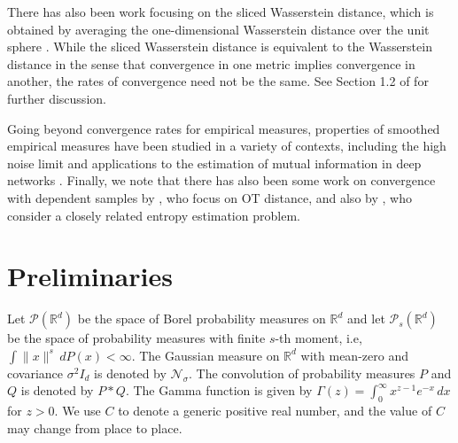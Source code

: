 \documentclass{article}
\theoremstyle{definition}
\newcommand{\reals}{\mathbb{R}}
\newcommand{\cN}{\mathcal{N}}
\newcommand{\cP}{\mathcal{P}}
\begin{document}
There has also been work focusing on the sliced Wasserstein distance,  which is obtained by averaging the one-dimensional Wasserstein distance over the unit sphere \cite{rabin2011wasserstein,bonneel2015sliced}. While the sliced Wasserstein distance is equivalent to the Wasserstein distance in the sense that convergence in one metric implies convergence in another, the rates of convergence need not be the same. See Section 1.2 of \cite{goldfeld2020asymptotic} for further discussion. 


Going beyond convergence rates for empirical measures, properties of smoothed empirical measures have been studied in a variety of contexts, including the high noise limit \cite{chen2020asymptotics} and applications to the estimation of mutual information in deep networks \cite{goldfeld2018estimating}. Finally, we note that there has also been some work on convergence with dependent samples by \cite{fournier:2015}, who focus on OT distance, and also by \cite{young2019consistent}, who  consider a closely related entropy estimation problem. 


\section{Preliminaries}

Let $\cP(\reals^d)$ be the space of Borel probability measures on $\reals^d$ and let $\cP_s(\reals^d)$ be the space of probability measures with finite $s$-th moment, i.e, $\int \|x\|^s \,dP(x) < \infty$. The Gaussian measure on $\reals^d$ with mean-zero and covariance $\sigma^2 I_d$ is denoted by $\cN_\sigma$. The convolution of probability measures $P$ and $Q$ is denoted by $P \ast Q$.  The Gamma function is given by $\Gamma (z)=\int _{0}^{\infty }x^{z-1}e^{-x}\,dx$ for $z > 0$. We use $C$ to denote a generic positive real number, and the value of $C$ may change from place to place. 
\end{document}
